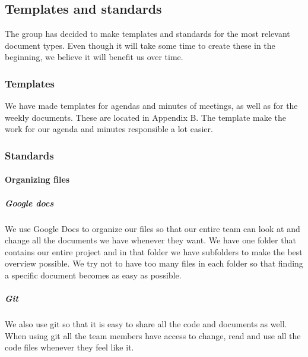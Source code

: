 \subsection{Templates and standards}
The group has decided to make templates and standards for the most relevant document types. Even though it will take some time to create these in the beginning, we believe it will benefit us over time.

\subsubsection{Templates}
We have made templates for agendas and minutes of meetings, as well as for the weekly documents. These are located in Appendix B. The template make the work for our agenda and minutes responsible a lot easier.

\subsubsection{Standards}

\paragraph{Organizing files}
\subparagraph{Google docs}\hfill
\newline
We use Google Docs to organize our files so that our entire team can look at and change all the documents we have whenever they want. We have one folder that contains our entire project and in that folder we have subfolders to make the best overview possible. We try not to have too many files in each folder so that finding a specific document becomes as easy as possible.

\subparagraph{Git}\hfill 
\newline
We also use git so that it is easy to share all the code and documents as well. When using git all the team members have access to change, read and use all the code files whenever they feel like it.

